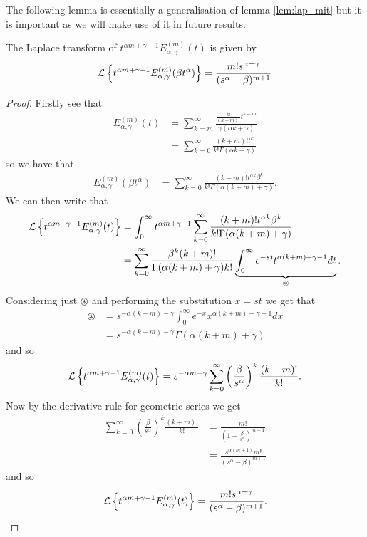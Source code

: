 The following lemma is essentially a generalisation of lemma \ref{lem:lap_mit} but it is important as we will make use of it in future results.
\begin{mdframed}[innertopmargin=10pt]
\begin{lemma}
	\label{lem:lap_mit_2}
	The Laplace transform of $ t^{\alpha m + \gamma - 1}E_{\alpha, \gamma}^{(m)}(t) $ is given by
	\begin{align}
		\mathcal{L} \left\{  t^{\alpha m + \gamma - 1}E_{\alpha,\gamma}^{(m)} (\beta t^\alpha) \right\} = \frac{m!s^{\alpha-\gamma}}{(s^\alpha - \beta)^{m+1}}
	\end{align}
\end{lemma}
\end{mdframed}
\begin{proof}
	Firstly see that
	\begin{align}
		E_{\alpha,\gamma}^{(m)}(t) &= \sum_{k=m}^{\infty} \frac{\frac{k!}{(k-m)!}t^{k-m}}{\gamma(\alpha k + \gamma)} \\
			&= \sum_{k=0}^{\infty} \frac{(k+m)!t^k}{k!\Gamma(\alpha k + \gamma)}
	\end{align}
	so we have that
	\begin{align}
		E_{\alpha, \gamma}^{(m)}(\beta t^\alpha) &= \sum_{k=0}^{\infty} \frac{(k+m)!t^{\alpha k} \beta^k}{k! \Gamma(\alpha (k+m) + \gamma)}.
	\end{align}
	We can then write that
	\begin{align}
		\mathcal{L} \left\{ t^{\alpha m + \gamma - 1}E_{\alpha, \gamma}^{(m)}(t) \right\} &= \int_0^\infty t^{\alpha m + \gamma - 1}  \sum_{k=0}^{\infty} \frac{(k+m)!t^{\alpha k} \beta^k}{k! \Gamma(\alpha (k+m) + \gamma)} \\
			&= \sum_{k=0}^\infty \frac{\beta^k (k+m)!}{\Gamma(\alpha(k+m) + \gamma) k!} \underbrace{\int_0^\infty e^{-st} t^{\alpha (k+m) + \gamma - 1}dt}_{\circledast}.
	\end{align}
	Considering just $ \circledast $ and performing the substitution $ x = st $ we get that 
	\begin{align}
		\circledast &= s^{-\alpha(k+m) - \gamma} \int_0^\infty e^{-x} x^{\alpha (k+m) + \gamma - 1} dx \\
			&= s^{-\alpha(k+m) - \gamma} \Gamma(\alpha(k+m) + \gamma)
	\end{align}
	and so 
	\begin{align}
		\mathcal{L} \left\{ t^{\alpha m + \gamma - 1}E_{\alpha, \gamma}^{(m)}(t) \right\} = s^{-\alpha m - \gamma}\sum_{k=0}^\infty \left(\frac{\beta}{s^\alpha}\right)^k\frac{(k+m)!}{k!} .
	\end{align}
	Now by the derivative rule for geometric series we get
	\begin{align}
		\sum_{k=0}^\infty \left(\frac{\beta}{s^\alpha}\right)^k\frac{(k+m)!}{k!} &= \frac{m!}{(1-\frac{\beta}{s^\alpha})^{m+1}} \\
			&= \frac{s^{\alpha(m+1)} m!}{(s^\alpha - \beta)^{m+1}}
	\end{align}
	and so 
	\begin{align}
		\mathcal{L} \left\{ t^{\alpha m + \gamma - 1}E_{\alpha, \gamma}^{(m)}(t) \right\} = \frac{m!s^{\alpha-\gamma}}{(s^\alpha - \beta)^{m+1}}.
	\end{align}
\end{proof}

